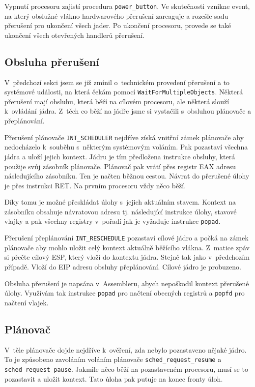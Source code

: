 \documentclass[a4paper,12pt]{article}
\begin{document}
Vypnutí procesoru zajistí procedura \verb+power_button+. Ve skutečnosti vznik\-ne event,
na který obslužné vlákno hardwarového přerušení zareaguje a rozešle sadu přerušení pro
ukončení všech jader. Po ukončení procesoru, provede se také ukončení všech otevřených
handlerů přerušení.

\subsection{Obsluha přerušení}
V~předchozí sekci jsem se již zmínil o~technickém provedení přerušení a to systémové
události, na která čekám pomocí \verb+WaitForMultipleObjects+. Některá přerušení mají
obsluhu, která běží na cílovém procesoru, ale některá slouží k~ovládání jádra.
Z~těch co běží na jádře jsme si vystačili s~obsluhou plánovače a přeplánování.

Přerušení plánovače \verb+INT_SCHEDULER+ nejdříve získá vnitřní zámek plánovače aby
nedocházelo k~souběhu s~některým systémovým voláním. Pak pozastaví všechna jádra a uloží jejich kontext. Jádru je tím předložena instrukce obsluhy, která použije svůj zásobník plánovače.
Plánovač pak vrátí přes registr EAX adresu následujícího zásobníku. Ten je načten běžnou cestou.
Návrat do přerušené úlohy je přes instrukci RET. Na prvním procesoru vždy něco běží.

Díky tomu je možné přeskládat úlohy s~jejich aktuálním stavem. Kontext na zásobníku
obsahuje návratovou adresu tj. následující instrukce úlohy, stavové vlajky a pak všechny
registry v~pořadí jak je vyžaduje instrukce \texttt{popad}.

Přerušení přeplánování \verb+INT_RESCHEDULE+ pozastaví cílové jádro a počká na zámek
plánovače aby mohlo uložit celý kontext aktuálně běžícího vlákna. Z~matice zpáv si přečte
cílový ESP, který vloží do kontextu jádra. Stejně tak jako v~předchozím případě. Vloží
do EIP adresu obsluhy přeplánování. Cílové jádro je probuzeno.

Obsluha přerušení je napsána v~Assembleru, abych nepoškodil kontext přerušené úlohy. Využívám tak
instrukce \texttt{popad} pro načtení obecných registrů a  \texttt{popfd} pro načtení vlajek.

\subsection{Plánovač}
V~těle plánovače dojde nejdříve k~ověření, zda nebylo pozastaveno nějaké jádro. To je
způsobeno zavoláním voláním plánovače \verb+sched_request_resume+ a \verb+sched_request_pause+.
Jakmile něco běží na pozastaveném procesoru, musí se to pozastavit a uložit kontext.
Tato úloha pak putuje na konec fronty úloh.
\end{document}
